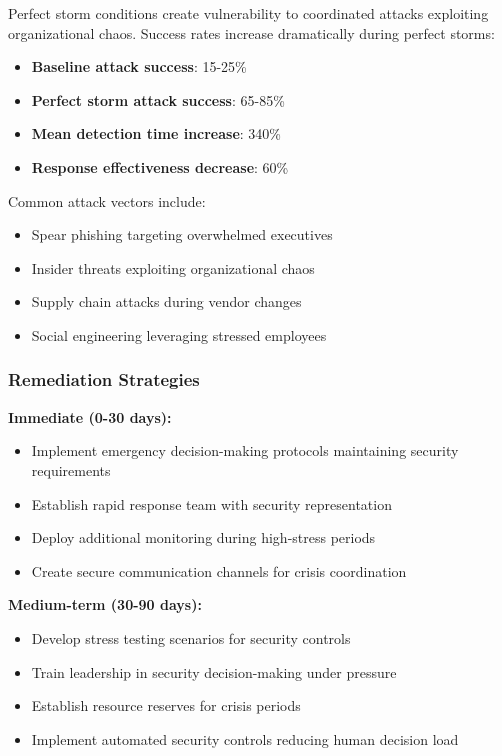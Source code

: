 \documentclass[11pt,a4paper]{article}
\begin{document}
Perfect storm conditions create vulnerability to coordinated attacks exploiting organizational chaos. Success rates increase dramatically during perfect storms:

\begin{itemize}
\item \textbf{Baseline attack success}: 15-25\%
\item \textbf{Perfect storm attack success}: 65-85\%
\item \textbf{Mean detection time increase}: 340\%
\item \textbf{Response effectiveness decrease}: 60\%
\end{itemize}

Common attack vectors include:
\begin{itemize}
\item Spear phishing targeting overwhelmed executives
\item Insider threats exploiting organizational chaos
\item Supply chain attacks during vendor changes
\item Social engineering leveraging stressed employees
\end{itemize}

\subsubsection{Remediation Strategies}

\textbf{Immediate (0-30 days):}
\begin{itemize}
\item Implement emergency decision-making protocols maintaining security requirements
\item Establish rapid response team with security representation
\item Deploy additional monitoring during high-stress periods
\item Create secure communication channels for crisis coordination
\end{itemize}

\textbf{Medium-term (30-90 days):}
\begin{itemize}
\item Develop stress testing scenarios for security controls
\item Train leadership in security decision-making under pressure
\item Establish resource reserves for crisis periods
\item Implement automated security controls reducing human decision load
\end{itemize}
\end{document}
